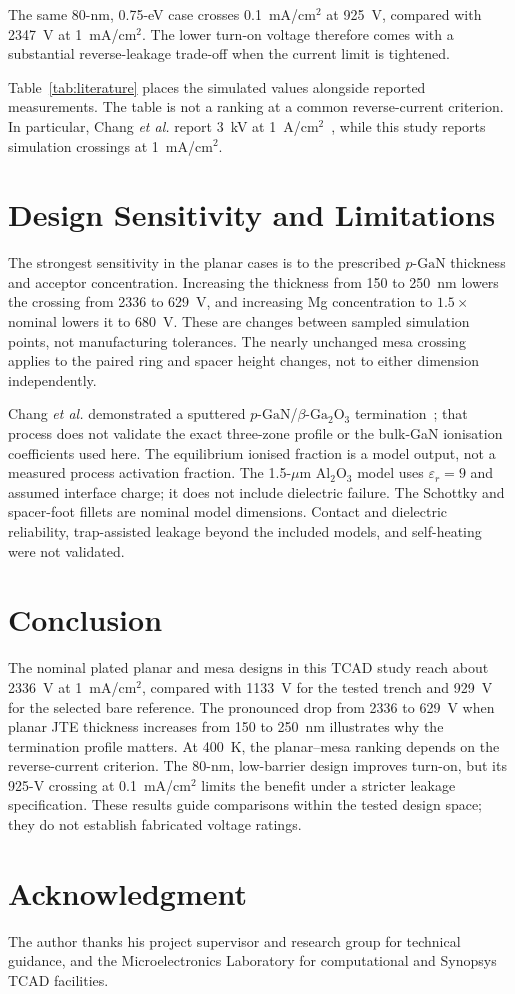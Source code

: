 \documentclass[journal,10pt]{IEEEtran}
\newcommand{\GaO}{\ensuremath{\beta\text{-}\mathrm{Ga}_2\mathrm{O}_3}}
\newcommand{\pGaN}{\ensuremath{p\text{-}\mathrm{GaN}}}
\begin{document}
The same 80-nm, 0.75-eV case crosses 0.1~mA/cm$^2$ at 925~V, compared with 2347~V at 1~mA/cm$^2$. The lower turn-on voltage therefore comes with a substantial reverse-leakage trade-off when the current limit is tightened.

Table~\ref{tab:literature} places the simulated values alongside reported measurements. The table is not a ranking at a common reverse-current criterion. In particular, Chang \emph{et al.} report 3~kV at 1~A/cm$^2$~\cite{Chang2025_APL}, while this study reports simulation crossings at 1~mA/cm$^2$.

\section{Design Sensitivity and Limitations}
The strongest sensitivity in the planar cases is to the prescribed \pGaN{} thickness and acceptor concentration. Increasing the thickness from 150 to 250~nm lowers the crossing from 2336 to 629~V, and increasing Mg concentration to $1.5\times$ nominal lowers it to 680~V. These are changes between sampled simulation points, not manufacturing tolerances. The nearly unchanged mesa crossing applies to the paired ring and spacer height changes, not to either dimension independently.

Chang \emph{et al.} demonstrated a sputtered \pGaN/\GaO{} termination~\cite{Chang2025_APL}; that process does not validate the exact three-zone profile or the bulk-GaN ionisation coefficients used here. The equilibrium ionised fraction is a model output, not a measured process activation fraction. The 1.5-$\mu$m Al$_2$O$_3$ model uses $\varepsilon_r=9$ and assumed interface charge; it does not include dielectric failure. The Schottky and spacer-foot fillets are nominal model dimensions. Contact and dielectric reliability, trap-assisted leakage beyond the included models, and self-heating were not validated.

\section{Conclusion}
The nominal plated planar and mesa designs in this TCAD study reach about 2336~V at 1~mA/cm$^2$, compared with 1133~V for the tested trench and 929~V for the selected bare reference. The pronounced drop from 2336 to 629~V when planar JTE thickness increases from 150 to 250~nm illustrates why the termination profile matters. At 400~K, the planar--mesa ranking depends on the reverse-current criterion. The 80-nm, low-barrier design improves turn-on, but its 925-V crossing at 0.1~mA/cm$^2$ limits the benefit under a stricter leakage specification. These results guide comparisons within the tested design space; they do not establish fabricated voltage ratings.

\section*{Acknowledgment}
The author thanks his project supervisor and research group for technical guidance, and the Microelectronics Laboratory for computational and Synopsys TCAD facilities.



\end{document}
